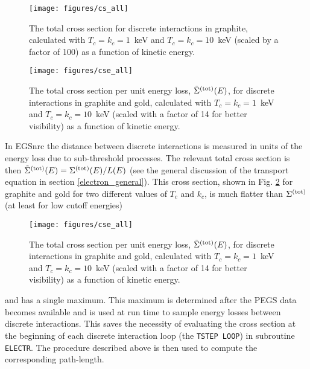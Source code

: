\begin{figure}[htp]
   \begin{minipage}{.4\textwidth}
      \centering
      \texttt{[image: figures/cs\_all]}
      \caption[Total discrete interaction cross sections]{\label{sigmas}
       The total cross section for discrete interactions in graphite, calculated with
       $T_c = k_c = 1$~keV and $T_c = k_c = 10$~keV (scaled by a factor of 100)
       as a function of kinetic energy.}
   \end{minipage}
   \hfill
   \begin{minipage}{.4\textwidth}
      \centering
      \texttt{[image: figures/cse\_all]}
      \caption[Total cross sections per unit energy loss]{\label{tilde_sigma}
          The total cross section per unit energy loss, $\tilde{\Sigma}^{\rm (tot)}(E)$,
          for discrete interactions in graphite and gold, calculated with $T_c = k_c = 1$~keV and
          $T_c = k_c = 10$~keV (scaled with a factor of 14 for better visibility)
          as a function of kinetic energy.}
   \end{minipage}
\end{figure}

In EGSnrc the distance between discrete interactions is measured
in units of the energy loss due to sub-threshold processes.
The relevant total cross section is then
$\tilde{\Sigma}^{\rm (tot)}(E) = \Sigma^{\rm (tot)}(E)/L(E)$
(see the general discussion
of the transport equation in section \ref{electron_general}).
This cross section, shown in Fig. \ref{tilde_sigma} for graphite and gold
for two different values of $T_c$ and $k_c$,
is much flatter than $\Sigma^{\rm (tot)}$
(at least for low cutoff energies)
\begin{figure}[htp]
\texttt{[image: figures/cse\_all]}
\caption[Total cross sections per unit energy loss]{\label{tilde_sigma}
The total cross section
per unit energy loss, $\tilde{\Sigma}^{\rm (tot)}(E)$, for
discrete interactions in graphite and gold, calculated with
$T_c = k_c = 1$~keV and $T_c = k_c = 10$~keV
(scaled with a factor of 14 for better visibility)
as a function of kinetic energy.}
\end{figure}
and has a single maximum. This maximum is determined after
the PEGS data becomes available and is used at run time to
sample energy losses between discrete interactions.
This saves the necessity of evaluating the cross section
at the beginning of each discrete interaction loop
(the {\tt TSTEP LOOP}) in subroutine {\tt ELECTR}.
The procedure described above
is then used to compute the corresponding path-length.

